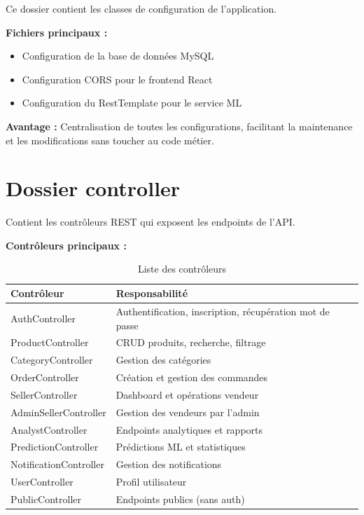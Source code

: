 \documentclass[12pt,a4paper]{report}
\begin{document}
Ce dossier contient les classes de configuration de l'application.

\textbf{Fichiers principaux :}
\begin{itemize}[noitemsep]
    \item Configuration de la base de données MySQL
    \item Configuration CORS pour le frontend React
    \item Configuration du RestTemplate pour le service ML
\end{itemize}

\textbf{Avantage :} Centralisation de toutes les configurations, facilitant la maintenance et les modifications sans toucher au code métier.

\section{Dossier controller}

Contient les contrôleurs REST qui exposent les endpoints de l'API.

\textbf{Contrôleurs principaux :}

\begin{table}[H]
    \centering
    \caption{Liste des contrôleurs}
    \begin{tabularx}{\textwidth}{lX}
        \toprule
        \textbf{Contrôleur} & \textbf{Responsabilité} \\
        \midrule
        AuthController & Authentification, inscription, récupération mot de passe \\
        ProductController & CRUD produits, recherche, filtrage \\
        CategoryController & Gestion des catégories \\
        OrderController & Création et gestion des commandes \\
        SellerController & Dashboard et opérations vendeur \\
        AdminSellerController & Gestion des vendeurs par l'admin \\
        AnalystController & Endpoints analytiques et rapports \\
        PredictionController & Prédictions ML et statistiques \\
        NotificationController & Gestion des notifications \\
        UserController & Profil utilisateur \\
        PublicController & Endpoints publics (sans auth) \\
        \bottomrule
    \end{tabularx}
    \label{tab:controllers}
\end{table}
\end{document}
